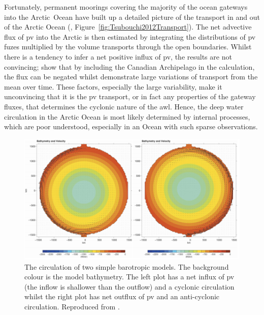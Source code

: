 \documentclass[12pt,a4paper]{report}
\newcommand*\figref[1]{Figure~\ref{#1}}
\begin{document}
Fortunately, permanent moorings 
covering the majority of the ocean gateways into the Arctic~Ocean have built
up a detailed picture of the transport in and out of the Arctic Ocean 
(\cite{tsubouchi2012arctic}, \figref{fig:Tsubouchi2012Transport}). The net 
advective flux of \gls{pv} into the Arctic is then estimated by integrating  the
 distributions of \gls{pv} fuzes multiplied by the volume transports through the 
 open boundaries.
Whilst there is a tendency to infer a net positive influx of \gls{pv}, the
results are not convincing; \cite{munchow2006observational} show that by including the
Canadian Archipelago in the \cite{yang2005arctic} calculation, the flux can be negated
whilst \cite{tsubouchi2012arctic} demonstrate large variations of transport 
from the mean over time. These factors, especially the 
large variability, make it unconvincing that it is the \gls{pv}
 transport, or in fact any properties of the gateway fluxes, that determines the 
cyclonic nature of the \gls{awl}.
Hence, the deep water circulation in the Arctic Ocean is most likely determined by 
internal processes, which are poor understood, especially in an Ocean with such sparse observations.

\begin{figure}
	\centering
	\includegraphics[width=\linewidth]{Yang2005}
	\caption[\cite{yang2005arctic}]{ The circulation of two simple barotropic
		models. The background colour is the model bathymetry. The left plot has
		a net influx of \gls{pv} (the inflow is shallower than the outflow) 
		and a cyclonic circulation whilst the right plot has net outflux of  \gls{pv} 
		and an anti-cyclonic circulation. Reproduced from \cite{yang2005arctic}.}
	\label{fig:Yang2005}
\end{figure}
\end{document}

